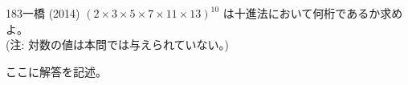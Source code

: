 \begin{prob}{183}{}{一橋 (2014)}
 $(2\times3\times5\times7\times11\times13)^{10}$ は十進法において何桁であるか求めよ。 \\
 (注: 対数の値は本問では与えられていない。)
\end{prob}
ここに解答を記述。
